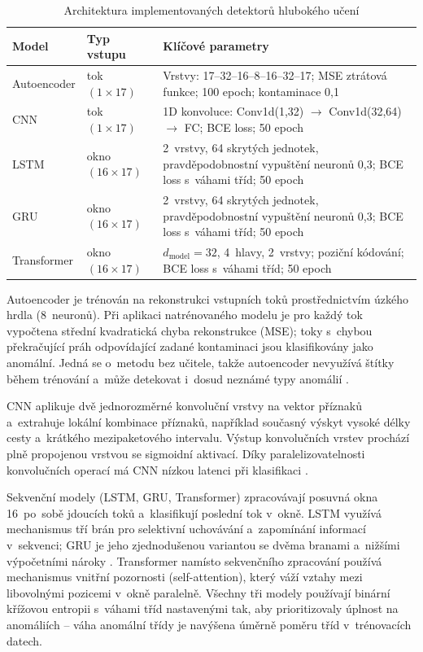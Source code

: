 \begin{table}[htbp]
\centering
\caption{Architektura implementovaných detektorů hlubokého učení}
\label{tab:ai-models}
\small
\begin{tabular}{llp{7cm}}
\toprule
Model & Typ vstupu & Klíčové parametry \\
\midrule
Autoencoder & tok $(1 \times 17)$ & Vrstvy: 17--32--16--8--16--32--17; MSE ztrátová funkce; 100 epoch; kontaminace 0{,}1 \\
CNN & tok $(1 \times 17)$ & 1D konvoluce: Conv1d(1,32) $\rightarrow$ Conv1d(32,64) $\rightarrow$ FC; BCE loss; 50 epoch \\
LSTM & okno $(16 \times 17)$ & 2~vrstvy, 64 skrytých jednotek, pravděpodobnostní vypuštění neuronů 0{,}3; BCE loss s~váhami tříd; 50 epoch \\
GRU & okno $(16 \times 17)$ & 2~vrstvy, 64 skrytých jednotek, pravděpodobnostní vypuštění neuronů 0{,}3; BCE loss s~váhami tříd; 50 epoch \\
Transformer & okno $(16 \times 17)$ & $d_\text{model}=32$, 4~hlavy, 2~vrstvy; poziční kódování; BCE loss s~váhami tříd; 50 epoch \\
\bottomrule
\end{tabular}
\end{table}

Autoencoder je trénován na rekonstrukci vstupních toků prostřednictvím úzkého hrdla (8~neuronů). Při aplikaci natrénovaného modelu je pro každý tok vypočtena střední kvadratická chyba rekonstrukce (MSE); toky s~chybou překračující práh odpovídající zadané kontaminaci jsou klasifikovány jako anomální. Jedná se o~metodu bez učitele, takže autoencoder nevyužívá štítky během trénování a~může detekovat i~dosud neznámé typy anomálií \parencite{Ji2024}.

CNN aplikuje dvě jednorozměrné konvoluční vrstvy na vektor příznaků a~extrahuje lokální kombinace příznaků, například současný výskyt vysoké délky cesty a~krátkého mezipaketového intervalu. Výstup konvolučních vrstev prochází plně propojenou vrstvou se sigmoidní aktivací. Díky paralelizovatelnosti konvolučních operací má CNN nízkou latenci při klasifikaci \parencite{Bakhshi2021}.

Sekvenční modely (LSTM, GRU, Transformer) zpracovávají posuvná okna 16~po~sobě jdoucích toků a~klasifikují poslední tok v~okně. LSTM využívá mechanismus tří brán pro selektivní uchovávání a~zapomínání informací v~sekvenci; GRU je jeho zjednodušenou variantou se dvěma branami a~nižšími výpočetními nároky \parencite{Bakhshi2021}. Transformer namísto sekvenčního zpracování používá mechanismus vnitřní pozornosti (self-attention), který váží vztahy mezi libovolnými pozicemi v~okně paralelně. Všechny tři modely používají binární křížovou entropii s~váhami tříd nastavenými tak, aby prioritizovaly úplnost na anomáliích -- váha anomální třídy je navýšena úměrně poměru tříd v~trénovacích datech.

